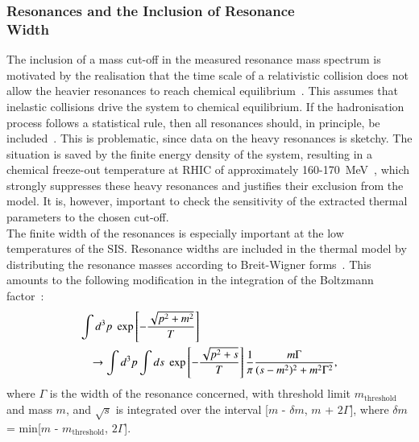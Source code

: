\documentclass{elsarticle}
\begin{document}
\subsubsection[Resonances and the Inclusion of Resonance
        Width]{Resonances and the Inclusion of Resonance\\
        Width}\label{SubSection::ResonanceWidth}

The inclusion of a mass cut-off in the measured resonance mass
spectrum is motivated by the realisation that the time scale of a
relativistic collision does not allow the heavier resonances to reach
chemical equilibrium~\cite{Sollfrank:1991xm}. This assumes that inelastic
collisions drive the system to chemical equilibrium. If the
hadronisation process follows a statistical rule, then all resonances
should, in principle, be included~\cite{Sollfrank:1997qv}. This is problematic,
since data on the heavy resonances is sketchy. The situation is saved
by the finite energy density of the system, resulting in a chemical freeze-out
temperature at RHIC of approximately 160-170~MeV~\cite{Kaneta:2004zr,Cleymans:2004pp}, which strongly suppresses
these heavy resonances and justifies their exclusion from the
model. It is, however, important to check the sensitivity of the
extracted thermal parameters to the chosen cut-off.\\ 

The finite width of the resonances is especially important at the low
temperatures of the SIS. Resonance widths are included in the thermal
model by distributing the resonance masses according to Breit-Wigner
forms~\cite{Becattini:1995if,Becattini:1997rv,Becattini:2000jw,Cleymans:1997sw,Sollfrank:1991xm,Becattini:1997ii}. This amounts to the following
modification in the integration of the Boltzmann factor~\cite{Cleymans:1997sw}:  
\begin{eqnarray}
\lefteqn{\int d^3p\; \exp\left[-{\sqrt{p^2+m^2}\over T}\right]} \nonumber \\    
& & \rightarrow \int d^3p \int ds\; \exp\left[-{\sqrt{p^2+s}\over T}\right]{1 \over \pi}{m\Gamma \over (s-m^2)^2+m^2\Gamma^2}, 
\end{eqnarray}
where $\Gamma$ is the width of the resonance concerned, with threshold
limit $m_{\mathrm{threshold}}$ and mass $m$, and $\sqrt{s}$ is
integrated over the interval [$m$ - $\delta m$, $m$ + $2\Gamma$], where
\linebreak $\delta m$ = min[$m$ - $m_{\mathrm{threshold}}$,
$2\Gamma$].\\ 
\end{document}
